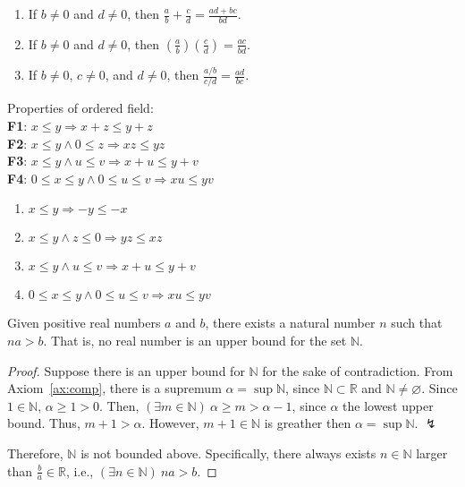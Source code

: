 \documentclass[../main.tex]{subfiles}
\begin{document}
\begin{prop}
    \begin{enumerate}
        \item If $b \neq 0$ and $d \neq 0$, then $\frac a b + \frac c d = \frac{ad + bc}{bd}$.
        \item If $b \neq 0$ and $d \neq 0$, then $\left(\frac a b\right)\left(\frac c d\right) = \frac{ac}{bd}$.
        \item If $b \neq 0$, $c \neq 0$, and $d \neq 0$, then $\frac{a/b}{c/d} = \frac{ad}{bc}$.
    \end{enumerate}
\end{prop}

\begin{prop}
    Properties of ordered field:\\
    \indent
    \textbf{F1}: $x \leq y \Rightarrow x + z \leq y + z$\\
    \indent
    \textbf{F2}: $x \leq y \wedge 0 \leq z \Rightarrow xz \leq yz$\\
    \indent
    \textbf{F3}: $x \leq y \wedge u \leq v \Rightarrow x + u \leq y + v$\\
    \indent
    \textbf{F4}: $0 \leq x \leq y \wedge 0 \leq u \leq v \Rightarrow xu \leq yv$\\
\end{prop}

\begin{prop}
    \begin{enumerate}
        \item $x \leq y \Rightarrow -y \leq -x$
        \item $x \leq y \wedge z \leq 0 \Rightarrow yz \leq xz$
        \item $x \leq y \wedge u \leq v \Rightarrow x + u \leq y + v$
        \item $0 \leq x \leq y \wedge 0 \leq u \leq v \Rightarrow xu \leq yv$
    \end{enumerate}
\end{prop}

\begin{thm} \label{thm:archimedean}
    Given positive real numbers $a$ and $b$, there exists a natural number $n$ such that $na > b$.
    That is, no real number is an upper bound for the set $\mathbb N$.
\end{thm}
\begin{proof}
    Suppose there is an upper bound for $\mathbb N$ for the sake of contradiction.
    From Axiom~\ref{ax:comp}, there is a supremum $\alpha = \sup \mathbb N$, since $\mathbb{N} \subset \mathbb{R}$ and $\mathbb{N} \neq \varnothing$.
    Since $1 \in \mathbb N$, $\alpha \geq 1 > 0$.
    Then, $(\exists m \in \mathbb{N})\ \alpha \geq m > \alpha - 1$, since $\alpha$ the lowest upper bound.
    Thus, $m + 1 > \alpha$.
    However, $m + 1 \in \mathbb{N}$ is greather then $\alpha = \sup \mathbb N$. $\lightning$

    Therefore, $\mathbb N$ is not bounded above.
    Specifically, there always exists $n \in \mathbb N$ larger than $\frac b a \in \mathbb R$, i.e., $(\exists n \in \mathbb{N})\ na > b$.
\end{proof}
\end{document}
